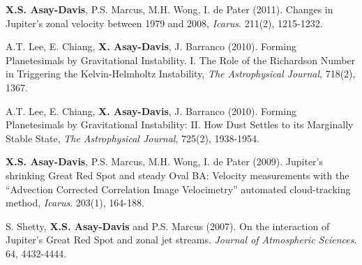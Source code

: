 \documentclass[12pt,letterpaper]{article}
\begin{document}
\begin{flushleft}
\begin{enumerate*}
\item \textbf{X.S. Asay-Davis}, P.S. Marcus, M.H. Wong, I. de Pater (2011). Changes in Jupiter's zonal velocity between 1979 and 2008, \textit{Icarus}. 211(2), 1215-1232.
\item A.T. Lee, E. Chiang, \textbf{X. Asay-Davis}, J. Barranco (2010). Forming Planetesimals by Gravitational Instability. I. The Role of the Richardson Number in Triggering the Kelvin-Helmholtz Instability, \textit{The Astrophysical Journal}, 718(2), 1367.
\item A.T. Lee, E. Chiang, \textbf{X. Asay-Davis}, J. Barranco (2010). Forming Planetesimals by Gravitational Instability: II. How Dust Settles to its Marginally Stable State, \textit{The Astrophysical Journal}, 725(2), 1938-1954. 
\item \textbf{X.S. Asay-Davis}, P.S. Marcus, M.H. Wong, I. de Pater (2009). Jupiter's shrinking Great Red Spot and steady Oval BA: Velocity measurements with the ``Advection Corrected Correlation Image Velocimetry'' automated cloud-tracking method, \textit{Icarus}. 203(1), 164-188.
\item S. Shetty, \textbf{X.S. Asay-Davis} and P.S. Marcus (2007). On the interaction of Jupiter's Great Red Spot and zonal jet streams. \textit{Journal of Atmospheric Sciences}. 64, 4432-4444. 
\end{enumerate*} 

\end{flushleft}
\end{document}
